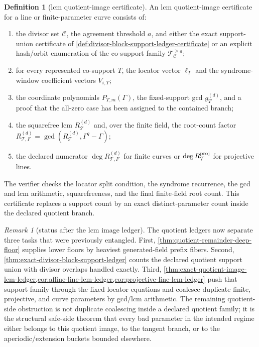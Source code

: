 \documentclass[11pt]{article}
\theoremstyle{definition}
\newtheorem{definition}[definition]{Definition}
\theoremstyle{remark}
\newtheorem{remark}[remark]{Remark}
\begin{document}
\begin{definition}[lcm quotient-image certificate]
\label{def:lcm-quotient-image-certificate}
An lcm quotient-image certificate for a line or finite-parameter curve consists
of:
\begin{enumerate}[label=\textup{(\roman*)},leftmargin=2.2em]
\item the divisor set $\mathcal C$, the agreement threshold $a$, and either the
exact support-union certificate of \cref{def:divisor-block-support-ledger-certificate}
or an explicit hash/orbit enumeration of the co-support family
$\mathcal T_{\mathcal C}^{\ge a}$;
\item for every represented co-support $T$, the locator vector
$\boldsymbol\ell_T$ and the syndrome-window coefficient vectors $V_{i,T}$;
\item the coordinate polynomials $P_{T,m}(\Gamma)$, the fixed-support gcd
$g_T^{(d)}$, and a proof that the all-zero case has been assigned to the
contained branch;
\item the squarefree lcm $R_{\mathcal T}^{(d)}$ and, over the finite field, the
root-count factor $R_{\mathcal T,F}^{(d)}=\gcd(R_{\mathcal T}^{(d)},\Gamma^q-\Gamma)$;
\item the declared numerator $\deg R_{\mathcal T,F}^{(d)}$ for finite curves or
$\deg R_{\mathcal T}^{\rm proj}$ for projective lines.
\end{enumerate}
The verifier checks the locator split condition, the syndrome recurrence, the
gcd and lcm arithmetic, squarefreeness, and the final finite-field root count.
This certificate replaces a support count by an exact distinct-parameter count
inside the declared quotient branch.
\end{definition}

\begin{remark}[status after the lcm image ledger]
\label{rem:lcm-image-ledger-status}
The quotient ledgers now separate three tasks that were previously entangled.
First, \cref{thm:quotient-remainder-deep-floor} supplies lower floors by
heaviest generated-field prefix fibers.  Second,
\cref{thm:exact-divisor-block-support-ledger} counts the declared quotient
support union with divisor overlaps handled exactly.  Third,
\cref{thm:exact-quotient-image-lcm-ledger,cor:affine-line-lcm-ledger,cor:projective-line-lcm-ledger}
push that support family through the fixed-locator equations and coalesce
duplicate finite, projective, and curve parameters by gcd/lcm arithmetic.  The
remaining quotient-side obstruction is not duplicate coalescing inside a declared
quotient family; it is the structural safe-side theorem that every bad parameter
in the intended regime either belongs to this quotient image, to the tangent
branch, or to the aperiodic/extension buckets bounded elsewhere.
\end{remark}
\end{document}

